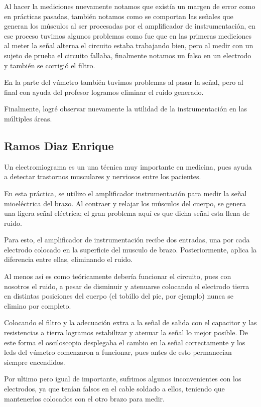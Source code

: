 \documentclass[12pt]{article}
\begin{document}
	    Al hacer la mediciones nuevamente notamos que existía un margen de error como en prácticas pasadas, también notamos como se comportan las señales que generan los músculos al ser procesadas por el amplificador de instrumentación, en ese proceso tuvimos algunos problemas como fue que en las primeras mediciones al meter la señal alterna el circuito estaba trabajando bien, pero al medir con un sujeto de prueba el circuito fallaba, finalmente notamos un falso en un electrodo y también se corrigió el filtro.
	    
	    En la parte del vúmetro también tuvimos problemas al pasar la señal, pero al final con ayuda del profesor logramos eliminar el ruido generado.
	    
	    Finalmente, logré observar nuevamente la utilidad de la instrumentación en las múltiples áreas.
	   
	    
	    \subsection{Ramos Diaz Enrique}
	    Un electromiograma es un una técnica muy importante en medicina, pues ayuda a detectar trastornos musculares y nerviosos entre los pacientes.
	    
	    En esta práctica, se utilizo el amplificador instrumentación para medir la señal mioeléctrica del brazo. Al contraer y relajar los músculos del cuerpo, se genera una ligera señal eléctrica; el gran problema aquí es que dicha señal esta llena de ruido.
	    
	    Para esto, el amplificador de instrumentación recibe dos entradas, una por cada electrodo colocado en la superficie del musculo de brazo. Posteriormente, aplica la diferencia entre ellas, eliminando el ruido.
	    
	    Al menos así es como teóricamente debería funcionar el circuito, pues con nosotros el ruido, a pesar de disminuir y atenuarse colocando el electrodo tierra en distintas posiciones del cuerpo (el tobillo del pie, por ejemplo) nunca se elimino por completo.
	    
	    Colocando el filtro y la adecuación extra a la señal de salida con el capacitor y las resistencias a tierra logramos estabilizar y atenuar la señal lo mejor posible. De este forma el osciloscopio desplegaba el cambio en la señal correctamente y los leds del vúmetro comenzaron a funcionar, pues antes de esto permanecían siempre encendidos.
	    
	    Por ultimo pero igual de importante, sufrimos algunos inconvenientes con los electrodos, ya que tenían falsos en el cable soldado a ellos, teniendo que mantenerlos colocados con el otro brazo para medir.
	    
\end{document}
